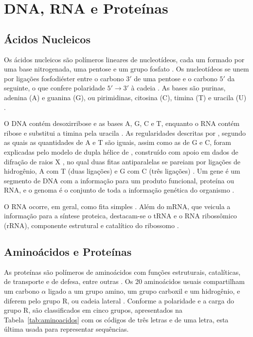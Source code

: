 \section{DNA, RNA e Proteínas}

\subsection{Ácidos Nucleicos}

Os ácidos nucleicos são polímeros lineares de nucleotídeos, cada um formado por uma base nitrogenada, uma pentose e um grupo fosfato \cite{Nelson2014}. Os nucleotídeos se unem por ligações fosfodiéster entre o carbono $3'$ de uma pentose e o carbono $5'$ da seguinte, o que confere polaridade $5' \rightarrow 3'$ à cadeia \cite{Nelson2014}. As bases são purinas, adenina (A) e guanina (G), ou pirimidinas, citosina (C), timina (T) e uracila (U) \cite{Nelson2014}.

O DNA contém desoxirribose e as bases A, G, C e T, enquanto o RNA contém ribose e substitui a timina pela uracila \cite{Nelson2014}. As regularidades descritas por , segundo as quais as quantidades de A e T são iguais, assim como as de G e C, foram explicadas pelo modelo de dupla hélice de , construído com apoio em dados de difração de raios X \cite{Franklin1953}, no qual duas fitas antiparalelas se pareiam por ligações de hidrogênio, A com T (duas ligações) e G com C (três ligações) \cite{Nelson2014}. Um gene é um segmento de DNA com a informação para um produto funcional, proteína ou RNA, e o genoma é o conjunto de toda a informação genética do organismo \cite{Alberts2017}.

O RNA ocorre, em geral, como fita simples \cite{Nelson2014}. Além do mRNA, que veicula a informação para a síntese proteica, destacam-se o tRNA e o RNA ribossômico (rRNA), componente estrutural e catalítico do ribossomo \cite{Alberts2017}.

\subsection{Aminoácidos e Proteínas}

As proteínas são polímeros de aminoácidos com funções estruturais, catalíticas, de transporte e de defesa, entre outras \cite{Nelson2014}. Os 20 aminoácidos usuais compartilham um carbono $\alpha$ ligado a um grupo amino, um grupo carboxil e um hidrogênio, e diferem pelo grupo R, ou cadeia lateral \cite{Nelson2014}. Conforme a polaridade e a carga do grupo R, são classificados em cinco grupos, apresentados na Tabela~\ref{tab:aminoacidos} com os códigos de três letras e de uma letra, esta última usada para representar sequências.

